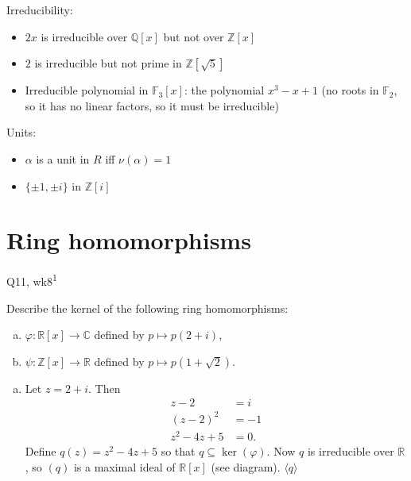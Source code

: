 Irreducibility:
    \begin{itemize}
        \item $2x$ is irreducible over $\mathbb{Q}[x]$ but not over $\mathbb{Z}[x]$
        \item $2$ is irreducible but not prime in $\mathbb{Z}[\sqrt{5}]$
        \item Irreducible polynomial in $\mathbb{F}_3[x]$: the polynomial $x^3 - x + 1$ (no roots in $\mathbb{F}_2$, so it has no linear factors, so it must be irreducible)
    \end{itemize}
    
Units:
    \begin{itemize}
        \item $\alpha$ is a unit in $R$ iff $\nu(\alpha) = 1$
        \item $\{\pm 1, \pm i\}$ in $\mathbb{Z}[i]$
    \end{itemize}

\newpage


\section{Ring homomorphisms}

\begin{problem}{Q11, wk8\textsuperscript{1}}{}


    Describe the kernel of the following ring homomorphisms:
    \begin{enumerate}[a)]
        \item $\varphi : \mathbb{R}[x] \to \mathbb{C}$ defined by $p \mapsto p(2 + i)$,
        \item $\psi : \mathbb{Z}[x] \to \mathbb{R}$ defined by $p \mapsto p(1 + \sqrt{2})$.
    \end{enumerate}

    \hrulefill

    \begin{enumerate}[a)]
        \item Let $z = 2 + i$. Then
                \begin{align}
                    z - 2 &= i \\
                    (z - 2)^2 &= -1 \\
                    z^2 - 4z + 5 &= 0 .
                \end{align}
            Define $q(z) = z^2 - 4z + 5$ so that $q \subseteq \ker(\varphi)$. Now $q$ is irreducible over $\mathbb{R}$, so $(q)$ is a maximal ideal of $\mathbb{R}[x]$ (see diagram).  $\langle q \rangle$ 
    \end{enumerate}

\end{problem}

